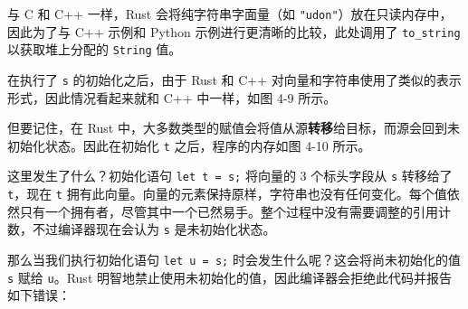 与 C 和 C++ 一样，Rust 会将纯字符串字面量（如 \texttt{"udon"}）放在只读内存中，因此为了与 C++ 示例和 Python 示例进行更清晰的比较，此处调用了 \texttt{to\_string} 以获取堆上分配的 \texttt{String} 值。

在执行了 \texttt{s} 的初始化之后，由于 Rust 和 C++ 对向量和字符串使用了类似的表示形式，因此情况看起来就和 C++ 中一样，如图 4-9 所示。


但要记住，在 Rust 中，大多数类型的赋值会将值从源\textbf{转移}给目标，而源会回到未初始化状态。因此在初始化 \texttt{t} 之后，程序的内存如图 4-10 所示。


这里发生了什么？初始化语句 \texttt{let t = s;} 将向量的 3 个标头字段从 \texttt{s} 转移给了 \texttt{t}，现在 \texttt{t} 拥有此向量。向量的元素保持原样，字符串也没有任何变化。每个值依然只有一个拥有者，尽管其中一个已然易手。整个过程中没有需要调整的引用计数，不过编译器现在会认为 \texttt{s} 是未初始化状态。

那么当我们执行初始化语句 \texttt{let u = s;} 时会发生什么呢？这会将尚未初始化的值 \texttt{s} 赋给 \texttt{u}。Rust 明智地禁止使用未初始化的值，因此编译器会拒绝此代码并报告如下错误：

